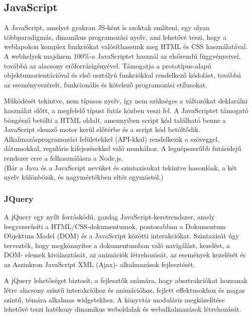 \subsection{JavaScript \cite{wikiJS}}

A JavaScript, amelyet gyakran JS-ként is szoktak említeni, egy olyan többparadigmás, dinamikus programozási nyelv, ami lehetővé teszi, hogy a weblapokon komplex funkciókat valósíthassunk meg HTML és CSS használatával. A webhelyek majdnem 100\%-a JavaScriptet használ az elsőrendű függvényeivel, továbbá az alacsony erőforrásigényével. Támogatja a prototípus-alapú objektumorientációval és első osztályú funkciókkal rendelkező kódolást, továbbá az eseményvezérelt, funkcionális és kötelező programozási stílusokat. 

Működését tekintve, nem típusos nyelv, így nem szükséges a változókat deklarálni használat előtt, a megfelelő típust futás közben veszi fel. A JavaScriptet támogató böngésző betölti a HTML oldalt, amennyiben script kód található benne a JavaScript elemző motor kerül előtérbe és a script kód betöltődik. Alkalmazásprogramozási felületekkel (API-kkal) rendelkezik a szöveggel, dátumokkal, reguláris kifejezésekkel való munkához. A legnépszerűbb futásidejű rendszer erre a felhasználásra a Node.js. \\
(Bár a Java és a JavaScript nevüket és szintaxisukat tekintve hasonlóak, a két nyelv különbözik, és nagymértékben eltér egymástól.)


\subsubsection{JQuery}

A jQuery egy nyílt forráskódú, gazdag JavaScript-keretrendszer, amely leegyszerűsíti a HTML/CSS-dokumentumok, pontosabban a Dokumentum Objektum Model (DOM) és a JavaScript közötti interakciókat. Szintaxisát úgy tervezték, hogy megkönnyítse a dokumentumban való navigálást, kezelést, a DOM- elemek kiválasztását, az animációk létrehozását, az események kezelését és az Aszinkron JavaScript XML (Ajax)- alkalmazások fejlesztését.

	 A jQuery lehetőséget biztosít, a fejlesztők számára, hogy absztrakciókat hozzanak létre alacsony szintű interakcióhoz és animációhoz, fejlett effektusokhoz és magas szintű, témára alkalmas widgetekhez. A könyvtár moduláris megközelítése lehetővé teszi hatékony dinamikus weboldalak és webalkalmazások létrehozását. \\

